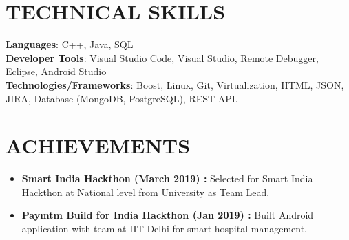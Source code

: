 \documentclass[letterpaper,11pt]{article}
\newcommand{\resumeItem}[1]{
  \item\small{
    {#1 \vspace{-2pt}}
  }
}
\newcommand{\resumeItemListStart}{\begin{itemize}}
\newcommand{\resumeItemListEnd}{\end{itemize}\vspace{-5pt}}
\begin{document}
%
\section{TECHNICAL SKILLS}
 \begin{itemize}[leftmargin=0.15in, label={}]
    \small{\item{
     \textbf{Languages}{: C++, Java, SQL} \\
     \textbf{Developer Tools}{: Visual Studio Code, Visual Studio, Remote Debugger, Eclipse, Android Studio} \\
     \textbf{Technologies/Frameworks}{: Boost, Linux, Git, Virtualization, HTML, JSON, JIRA, Database (MongoDB, PostgreSQL), REST API.} \\
    }}
 \end{itemize}
 \vspace{-16pt}

\section{ACHIEVEMENTS}
    \resumeItemListStart
        \resumeItem{\textbf{Smart India Hackthon (March 2019) : }Selected for Smart India Hackthon at National level from University as Team Lead.}
        \resumeItem{\textbf{Paymtm Build for India Hackthon (Jan 2019) : }Built Android application with team at IIT Delhi for smart hospital management.}
    \resumeItemListEnd
\end{document}
